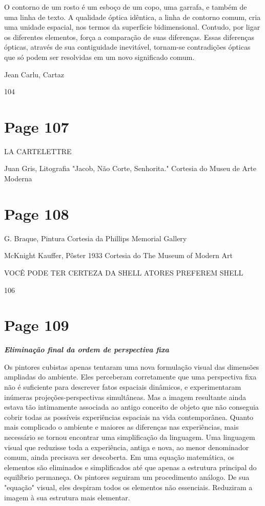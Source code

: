 \documentclass[a4paper]{article}
\begin{document}
O contorno de um rosto é um esboço de um copo, uma garrafa, e também de uma linha de texto. A qualidade óptica idêntica, a linha de contorno comum, cria uma unidade espacial, nos termos da superfície bidimensional. Contudo, por ligar os diferentes elementos, força a comparação de suas diferenças. Essas diferenças ópticas, através de sua contiguidade inevitável, tornam-se contradições ópticas que só podem ser resolvidas em um novo significado comum.

Jean Carlu, Cartaz

104

\newpage
\section*{Page 107}

LA CARTELETTRE

Juan Gris, Litografia "Jacob, Não Corte, Senhorita." Cortesia do Museu de Arte Moderna

\newpage
\section*{Page 108}

G. Braque, Pintura
Cortesia da Phillips Memorial Gallery

McKnight Kauffer, Pôster 1933
Cortesia do The Museum of Modern Art

VOCÊ PODE TER CERTEZA DA SHELL
ATORES PREFEREM SHELL

106

\newpage
\section*{Page 109}

\begin{center}
    {\Large\textbf{\textit{Eliminação final da ordem de perspectiva fixa}}}
\end{center}

\begingroup
\raggedright

Os pintores cubistas apenas tentaram uma nova formulação visual das dimensões ampliadas do ambiente. Eles perceberam corretamente que uma perspectiva fixa não é suficiente para descrever fatos espaciais dinâmicos, e experimentaram inúmeras projeções-perspectivas simultâneas. Mas a imagem resultante ainda estava tão intimamente associada ao antigo conceito de objeto que não conseguia cobrir todas as possíveis experiências espaciais na vida contemporânea. Quanto mais complicado o ambiente e maiores as diferenças nas experiências, mais necessário se tornou encontrar uma simplificação da linguagem. Uma linguagem visual que reduzisse toda a experiência, antiga e nova, ao menor denominador comum, ainda precisava ser descoberta. Em uma equação matemática, os elementos são eliminados e simplificados até que apenas a estrutura principal do equilíbrio permaneça. Os pintores seguiram um procedimento análogo. De sua "equação" visual, eles despiram todos os elementos não essenciais. Reduziram a imagem à sua estrutura mais elementar.
\end{document}
